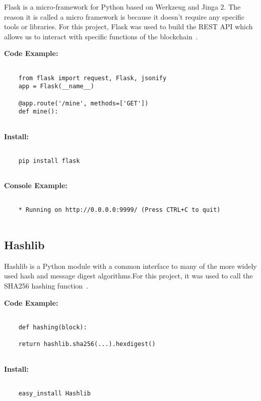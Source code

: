 Flask is a micro-framework for Python based on Werkzeug and Jinga 2. The reason 
it is called a micro framework is because it doesn't require any specific tools 
or libraries. For this project, Flask was used to build the REST API which 
allows us to interact with specific functions of the blockchain~\cite{hid-sp18-414-www-flask-python-microframewor}. 

\bigskip
\noindent
\textbf{Code Example:}
\begin{footnotesize}
\begin{verbatim}

    from flask import request, Flask, jsonify
   	app = Flask(__name__)

    @app.route('/mine', methods=['GET'])
    def mine():
    
\end{verbatim}
\end{footnotesize}
\noindent
\textbf{Install:}
\begin{footnotesize}
\begin{verbatim}

    pip install flask
    
\end{verbatim}
\end{footnotesize}
\noindent
\textbf{Console Example:}
\begin{footnotesize}
\begin{verbatim}

    * Running on http://0.0.0.0:9999/ (Press CTRL+C to quit)
    
\end{verbatim}
\end{footnotesize}
\subsection{Hashlib}

Hashlib is a Python module with a common interface to many of the more widely used hash and 
message digest algorithms.For this project, it was used to call the SHA256 hashing function~\cite{hid-sp18-414-www-hashlib-secure}.

\bigskip
\noindent
\textbf{Code Example:}
\begin{footnotesize}
\begin{verbatim}

    def hashing(block):

    return hashlib.sha256(...).hexdigest()
    
\end{verbatim}
\end{footnotesize}
\noindent
\textbf{Install:}
\begin{footnotesize}
\begin{verbatim}

    easy_install Hashlib
    
\end{verbatim}
\end{footnotesize}

